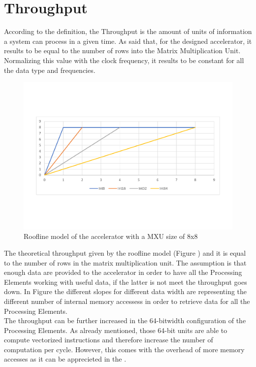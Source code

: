 \section{Throughput}
According to the definition, the Throughput is the amount of units of information a system can process in a given time. As said that, for the designed accelerator, it results to be equal to the number of rows into the Matrix Multiplication Unit. Normalizing this value with the clock frequency, it results to be constant for all the data type and frequencies.
\begin{figure}[!htbp]
\centering
\captionsetup{justification=centering}
\includegraphics[scale=0.45,angle=0]{./figure/graphs/roofline.pdf}
\caption{Roofline model of the accelerator with a MXU size of 8x8}
\label{fig:roofline}
\end{figure}

The theoretical throughput given by the roofline model (Figure \label{fig:roofline}) and it is equal to the number of rows in the matrix multiplication unit. The assumption is that enough data are provided to the accelerator in order to have all the Processing Elements working with useful data, if the latter is not meet the throughput goes down.
In Figure \label{fig:roofline} the different slopes for different data width are representing the different number of internal memory accessess in order to retrieve data for all the Processing Elements.\\

The throughput can be further increased in the 64-bitwidth configuration of the Processing Elements. As already mentioned, those 64-bit units are able to compute vectorized instructions and therefore increase the number of computation per cycle. However, this comes with the overhead of more memory accesses as it can be apprecieted in the \label{fig:rooflinevect}.

